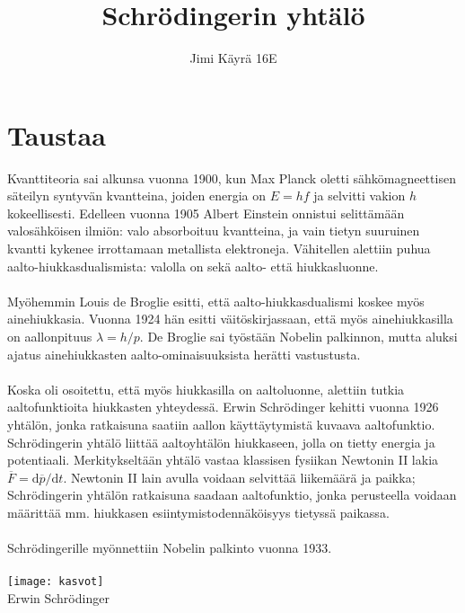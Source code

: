 \documentclass{article}
\date{}
\title{\textbf{Schrödingerin yhtälö}}
\author{Jimi Käyrä 16E}
\begin{document}
\begin{titlepage}
\maketitle
\tableofcontents
\end{titlepage}

\section{Taustaa}
Kvanttiteoria sai alkunsa vuonna 1900, kun Max Planck oletti sähkömagneettisen säteilyn syntyvän kvantteina, joiden energia on \(E=hf\) ja selvitti vakion \(h\) kokeellisesti. Edelleen vuonna 1905 Albert Einstein onnistui selittämään valosähköisen ilmiön: valo absorboituu kvantteina, ja vain tietyn suuruinen kvantti kykenee irrottamaan metallista elektroneja. Vähitellen alettiin puhua aalto-hiukkasdualismista: valolla on sekä aalto- että hiukkasluonne.\\
 \\
Myöhemmin Louis de Broglie esitti, että aalto-hiukkasdualismi koskee myös ainehiukkasia.
Vuonna 1924 hän esitti väitöskirjassaan, että myös ainehiukkasilla on aallonpituus \(\lambda =h/p\). De Broglie sai työstään Nobelin palkinnon, mutta aluksi ajatus ainehiukkasten aalto-ominaisuuksista herätti vastustusta.\\
 \\
Koska oli osoitettu, että myös hiukkasilla on aaltoluonne, alettiin tutkia aaltofunktioita hiukkasten yhteydessä. Erwin Schrödinger kehitti vuonna 1926 yhtälön, jonka ratkaisuna saatiin aallon käyttäytymistä kuvaava aaltofunktio. Schrödingerin yhtälö liittää aaltoyhtälön hiukkaseen, jolla on tietty energia ja potentiaali. Merkitykseltään yhtälö vastaa klassisen fysiikan Newtonin II lakia \(\overline{F}=\text{d}\overline{p}/\text{d}t\). Newtonin II lain avulla voidaan selvittää liikemäärä ja paikka; Schrödingerin yhtälön ratkaisuna saadaan aaltofunktio, jonka perusteella voidaan määrittää mm. hiukkasen esiintymistodennäköisyys tietyssä paikassa.\\
 \\
Schrödingerille myönnettiin Nobelin palkinto vuonna 1933.
 \\
  \\
\texttt{[image: kasvot]}\\
Erwin Schrödinger

\newpage
\end{document}
